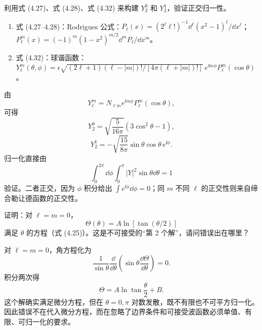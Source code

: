 \begin{question}
利用式 (4.27)、式 (4.28)、式 (4.32) 来构建 $Y_2^0$ 和 $Y_2^1$，验证正交归一性。

\par\smallskip
{}
\begin{enumerate}[leftmargin=2.2em,itemsep=0.12em,topsep=0.12em,parsep=0pt]
\item 式 (4.27--4.28)：Rodrigues 公式：$P_\ell(x)=(2^\ell\ell!)^{-1}\dd^\ell(x^2-1)^\ell/\dd x^\ell$；$P_\ell^m(x)=(-1)^m(1-x^2)^{m/2}\dd^mP_\ell/\dd x^m$。
\item 式 (4.32)：球谐函数：$Y_\ell^m(\theta,\phi)=\epsilon\sqrt{(2\ell+1)(\ell-|m|)!/[4\pi(\ell+|m|)!]}\,e^{\ii m\phi}P_\ell^m(\cos\theta)$。
\end{enumerate}

\end{question}
\begin{solution}

由
\[
Y_\ell^m=N_{\ell m}e^{\ii m\phi}P_\ell^m(\cos\theta),
\]
可得
\[
Y_2^0=\sqrt{\frac{5}{16\pi}}(3\cos^2\theta-1),
\]
\[
Y_2^1=-\sqrt{\frac{15}{8\pi}}\sin\theta\cos\theta\,e^{\ii\phi}.
\]
归一化直接由
\[
\int_0^{2\pi}\!\dd\phi\int_0^\pi |Y|^2\sin\theta\dd\theta=1
\]
验证。二者正交，因为 $\phi$ 积分给出 $\int e^{\ii\phi}\dd\phi=0$；同 $m$ 不同 $\ell$ 的正交性则来自缔合勒让德函数的正交性。

\end{solution}

\begin{question}
证明：对 $\ell=m=0$，
\[
\Theta(\theta)=A\ln[\tan(\theta/2)]
\]
满足 $\theta$ 的方程（式 (4.25)）。这是不可接受的“第 2 个解”，请问错误出在哪里？

\par\smallskip
{}

\end{question}
\begin{solution}

对 $\ell=m=0$，角方程化为
\[
\frac{1}{\sin\theta}\frac{\dd}{\dd\theta}\left(\sin\theta\frac{\dd\Theta}{\dd\theta}\right)=0.
\]
积分两次得
\[
\Theta=A\ln\tan\frac{\theta}{2}+B.
\]
这个解确实满足微分方程，但在 $\theta=0,\pi$ 对数发散，既不有限也不可平方归一化。因此错误不在代入微分方程，而在忽略了边界条件和可接受波函数必须单值、有限、可归一化的要求。

\end{solution}

